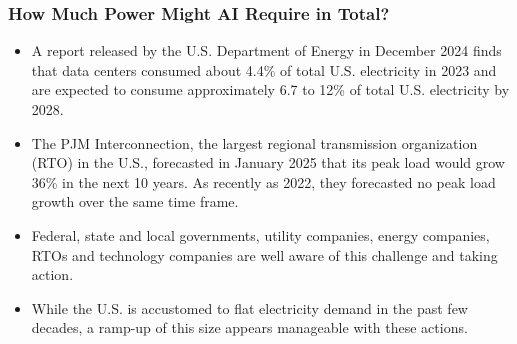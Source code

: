 \documentclass[aspectratio=169]{beamer}
\begin{document}
    \begin{frame}
        \frametitle{How Much Power Might AI Require in Total?}
        \begin{itemize}
            \item A report released by the U.S. Department of Energy in December 2024 finds that data centers consumed about 4.4\% of total U.S. electricity in 2023 and are expected to consume approximately 6.7 to 12\% of total U.S. electricity by 2028.~\parencite{doe_2024}
            \item The PJM Interconnection, the largest regional transmission organization (RTO) in the U.S., forecasted in January 2025 that its peak load would grow 36\% in the next 10 years. As recently as 2022, they forecasted no peak load growth over the same time frame.~\parencite{pjm_2025}
            \item Federal, state and local governments, utility companies, energy companies, RTOs and technology companies are well aware of this challenge and taking action.
            \item While the U.S. is accustomed to flat electricity demand in the past few decades, a ramp-up of this size appears manageable with these actions.
        \end{itemize}
    \end{frame}
\end{document}
